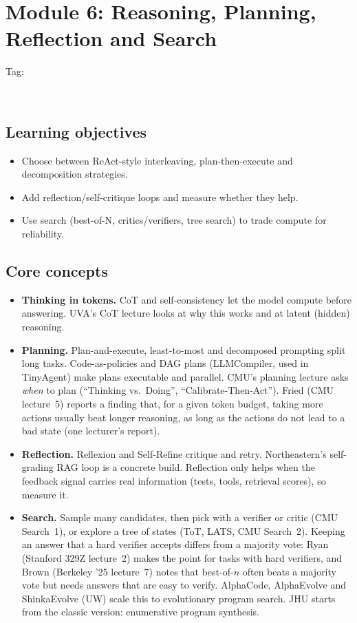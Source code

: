 \documentclass[10pt,oneside]{report}
\newcommand{\tg}[1]{{\setlength{\fboxsep}{1.2pt}\colorbox{tag#1}{\kern1pt\textcolor{white}{\sffamily\bfseries\fontsize{5.5}{6}\selectfont\strut #1}\kern1.5pt}}}
\begin{document}
\chapter{Module 6: Reasoning, Planning, Reflection and Search}\hypertarget{mod-RSN}{}
{\small Tag: \tg{RSN}}
\section{Learning objectives}
\begin{itemize}
\item Choose between ReAct-style interleaving, plan-then-execute and decomposition strategies.
\item Add reflection/self-critique loops and measure whether they help.
\item Use search (best-of-N, critics/verifiers, tree search) to trade compute for reliability.
\end{itemize}
\section{Core concepts}
\begin{itemize}
\item \textbf{Thinking in tokens.} CoT and self-consistency let the model compute before answering. UVA's CoT lecture looks at why this works and at latent (hidden) reasoning.
\item \textbf{Planning.} Plan-and-execute, least-to-most and decomposed prompting split long tasks. Code-as-policies and DAG plans (LLMCompiler, used in TinyAgent) make plans executable and parallel. CMU's planning lecture asks \emph{when} to plan (``Thinking vs.\ Doing'', ``Calibrate-Then-Act''). Fried (CMU lecture~5) reports a finding that, for a given token budget, taking more actions usually beat longer reasoning, as long as the actions do not lead to a bad state (one lecturer's report).
\item \textbf{Reflection.} Reflexion and Self-Refine critique and retry. Northeastern's self-grading RAG loop is a concrete build. Reflection only helps when the feedback signal carries real information (tests, tools, retrieval scores), so measure it.
\item \textbf{Search.} Sample many candidates, then pick with a verifier or critic (CMU Search~1), or explore a tree of states (ToT, LATS, CMU Search~2). Keeping an answer that a hard verifier accepts differs from a majority vote: Ryan (Stanford 329Z lecture~2) makes the point for tasks with hard verifiers, and Brown (Berkeley '25 lecture~7) notes that best-of-$n$ often beats a majority vote but needs answers that are easy to verify. AlphaCode, AlphaEvolve and ShinkaEvolve (UW) scale this to evolutionary program search. JHU starts from the classic version: enumerative program synthesis.
\end{itemize}
\end{document}
